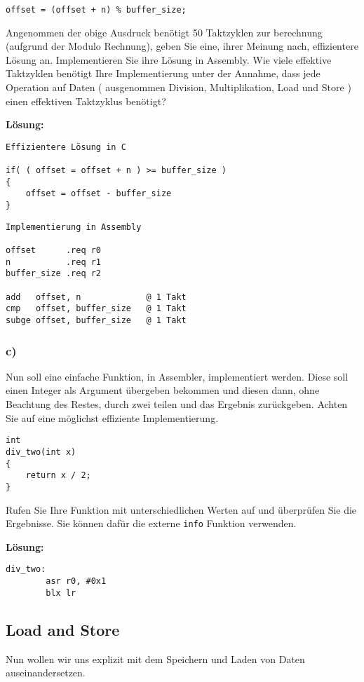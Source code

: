 \documentclass[12pt]{article}
\begin{document}
\begin{lstlisting}
offset = (offset + n) % buffer_size;
\end{lstlisting}

Angenommen der obige Ausdruck benötigt 50 Taktzyklen zur berechnung (aufgrund
der Modulo Rechnung), geben Sie
eine, ihrer Meinung nach, effizientere Lösung an. Implementieren Sie ihre Lösung
in Assembly. Wie viele effektive Taktzyklen benötigt Ihre Implementierung unter
der Annahme, dass jede Operation auf Daten ( ausgenommen Division,
Multiplikation, Load und Store ) einen effektiven Taktzyklus benötigt?

\textbf{Lösung:}
\begin{lstlisting}
Effizientere Lösung in C

if( ( offset = offset + n ) >= buffer_size )
{
    offset = offset - buffer_size 
}
\end{lstlisting}

\begin{lstlisting}
Implementierung in Assembly

offset      .req r0
n           .req r1
buffer_size .req r2

add   offset, n             @ 1 Takt
cmp   offset, buffer_size   @ 1 Takt
subge offset, buffer_size   @ 1 Takt
\end{lstlisting}

\subsubsection{c)}
Nun soll eine einfache Funktion, in Assembler, implementiert werden. Diese soll einen Integer als Argument übergeben bekommen
und diesen dann, ohne Beachtung des Restes, durch zwei teilen und das Ergebnis zurückgeben. Achten Sie auf eine möglichst effiziente
Implementierung.

\begin{lstlisting}
int 
div_two(int x)
{
	return x / 2;
}
\end{lstlisting}

Rufen Sie Ihre Funktion mit unterschiedlichen Werten auf und überprüfen Sie die Ergebnisse. Sie können dafür
die externe \texttt{info} Funktion verwenden.

\textbf{Lösung:}
\begin{lstlisting}
div_two:
        asr r0, #0x1
        blx lr
\end{lstlisting}

\subsection{Load and Store}
Nun wollen wir uns explizit mit dem Speichern und Laden von Daten auseinandersetzen.
\end{document}
